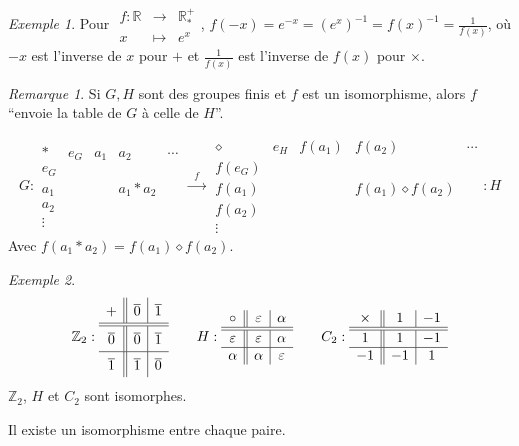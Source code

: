 \documentclass{report}
\newcommand*{\reels}{\mathbb{R}}
\newcommand*{\entiers}{\mathbb{Z}}
\theoremstyle{definition}
\theoremstyle{remark}
\newtheorem*{exem}{Exemple}
\newtheorem*{rema}{Remarque}
\begin{document}
	\begin{exem}
		Pour $\begin{array}{rcl}
			f:\reels&\to&\reels^+_*\\
			x&\mapsto&e^x
		\end{array}$, $f(-x)=e^{-x}=(e^x)^{-1}=f(x)^{-1}=\frac{1}{f(x)}$, o\`u $-x$ est l'inverse de $x$ pour $+$ et $\frac{1}{f(x)}$ est l'inverse de $f(x)$ pour $\times$.
	\end{exem}
	\begin{rema}
		Si $G,H$ sont des groupes finis et $f$ est un isomorphisme, alors $f$ ``envoie la table de $G$ \`a celle de $H$''.

		\[
		G:
		\begin{array}{c||c|c|c|c}
			*&e_G&a_1&a_2&\dotsb\\
			\hline\hline
			e_G&&&&\\
			\hline
			a_1&&&a_1*a_2&\\
			\hline
			a_2&&&&\\
			\hline
			\vdots&&&&
		\end{array}
		\xrightarrow{~~~f~~~}
		\begin{array}{c||c|c|c|c}
			\diamond&e_H&f(a_1)&f(a_2)&\dotsb\\
			\hline\hline
			f(e_G)&&&&\\
			\hline
			f(a_1)&&&f(a_1) \diamond f(a_2)&\\
			\hline
			f(a_2)&&&&\\
			\hline
			\vdots&&&&
		\end{array}
		:H
		\]
		Avec $f(a_1*a_2)=f(a_1) \diamond f(a_2)$.
		\begin{exem}
			\[
			\entiers_2:
			\renewcommand{\arraystretch}{1.5}
			\begin{array}{c||c|c}
				+&\overline0&\overline1\\
				\hline\hline
				\overline0&\overline0&\overline1\\
				\hline
				\overline1&\overline1&\overline0
			\end{array}
			\renewcommand{\arraystretch}{1}
			\qquad
			H:
			\begin{array}{c||c|c}
				\circ&\varepsilon&\alpha\\
				\hline\hline
				\varepsilon&\varepsilon&\alpha\\
				\hline
				\alpha&\alpha&\varepsilon
			\end{array}
			\qquad
			C_2:
			\begin{array}{c||c|c}
				\times&1&-1\\
				\hline\hline
				1&1&-1\\
				\hline
				-1&-1&1
			\end{array}
			\]
			$\entiers_2$, $H$ et $C_2$ sont isomorphes.

			Il existe un isomorphisme entre chaque paire.
		\end{exem}
	\end{rema}
\end{document}
